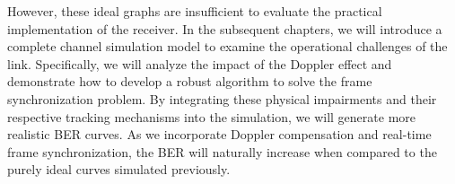 However, these ideal graphs are insufficient to evaluate the practical implementation of the receiver. In the subsequent chapters, we will introduce a complete channel simulation model to examine the operational challenges of the link. Specifically, we will analyze the impact of the Doppler effect and demonstrate how to develop a robust algorithm to solve the frame synchronization problem. By integrating these physical impairments and their respective tracking mechanisms into the simulation, we will generate more realistic BER curves. As we incorporate Doppler compensation and real-time frame synchronization, the BER will naturally increase when compared to the purely ideal curves simulated previously.


